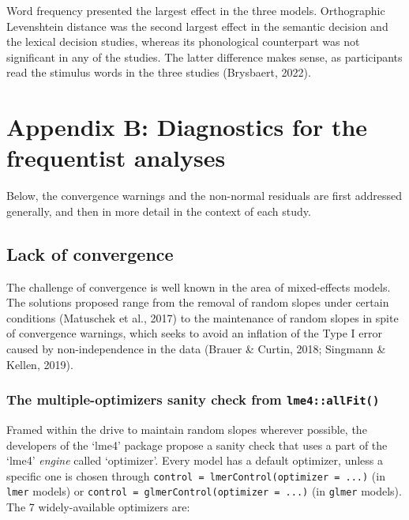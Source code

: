 \documentclass[
  12pt,
  man,floatsintext]{apa7}
\begin{document}
Word frequency presented the largest effect in the three models. Orthographic Levenshtein distance was the second largest effect in the semantic decision and the lexical decision studies, whereas its phonological counterpart was not significant in any of the studies. The latter difference makes sense, as participants read the stimulus words in the three studies (Brysbaert, 2022).

\clearpage

\renewcommand{\thefigure}{B\arabic{figure}} \setcounter{figure}{0}
\renewcommand{\thetable}{B\arabic{table}} \setcounter{table}{0}

\hypertarget{appendix-B-frequentist-analysis-diagnostics}{%
\section{Appendix B: Diagnostics for the frequentist analyses}\label{appendix-B-frequentist-analysis-diagnostics}}

Below, the convergence warnings and the non-normal residuals are first addressed generally, and then in more detail in the context of each study.

\hypertarget{lack-of-convergence}{%
\subsection{Lack of convergence}\label{lack-of-convergence}}

The challenge of convergence is well known in the area of mixed-effects models. The solutions proposed range from the removal of random slopes under certain conditions (Matuschek et al., 2017) to the maintenance of random slopes in spite of convergence warnings, which seeks to avoid an inflation of the Type I error caused by non-independence in the data (Brauer \& Curtin, 2018; Singmann \& Kellen, 2019).

\hypertarget{the-multiple-optimizers-sanity-check-from-lme4allfit}{%
\subsubsection{\texorpdfstring{The multiple-optimizers sanity check from \texttt{lme4::allFit()}}{The multiple-optimizers sanity check from lme4::allFit()}}\label{the-multiple-optimizers-sanity-check-from-lme4allfit}}

Framed within the drive to maintain random slopes wherever possible, the developers of the `lme4' package propose a sanity check that uses a part of the `lme4' \emph{engine} called `optimizer'. Every model has a default optimizer, unless a specific one is chosen through \texttt{control\ =\ lmerControl(optimizer\ =\ \textquotesingle{}...\textquotesingle{})} (in \texttt{lmer} models) or \texttt{control\ =\ glmerControl(optimizer\ =\ \textquotesingle{}...\textquotesingle{})} (in \texttt{glmer} models). The 7 widely-available optimizers are:
\end{document}
